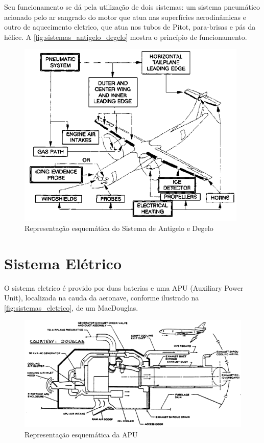 Seu funcionamento se dá pela utilização de dois sistemas: um sistema pneumático acionado pelo ar sangrado do motor que atua nas superfícies aerodinâmicas e outro de aquecimento eletrico, que atua nos tubos de Pitot, para-brisas e pás da hélice.
A \autoref{fig:sistemas_antigelo_degelo} mostra o princípio de funcionamento.

\begin{figure}
\includegraphics[width=\textwidth]{images/parte3/sistemas_antigelo_degelo.png}
\caption{Representação esquemática do Sistema de Antigelo e Degelo}
\label{fig:sistemas_antigelo_degelo}
\end{figure}


\section{Sistema Elétrico}

O sistema eletrico é provido por duas baterias e uma APU (Auxiliary Power Unit), localizada na cauda da aeronave, conforme ilustrado na \autoref{fig:sistemas_eletrico}, de um MacDouglas.

\begin{figure}
\includegraphics[width=\textwidth]{images/parte3/sistemas_eletrico.png}
\caption{Representação esquemática da APU}
\label{fig:sistemas_eletrico}
\end{figure}

